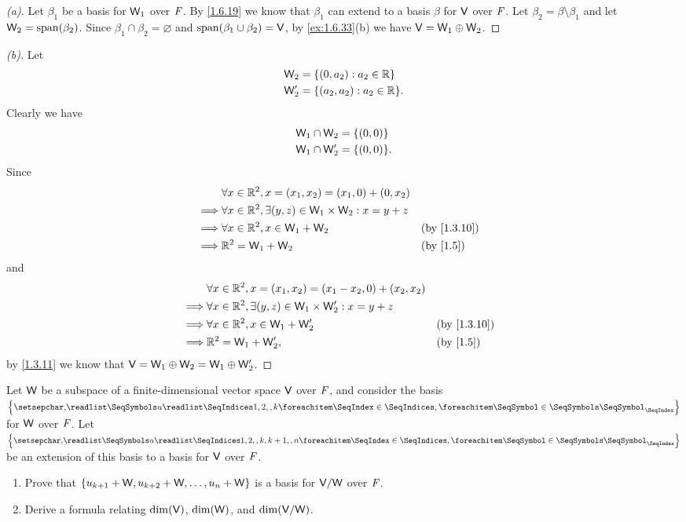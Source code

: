 \begin{proof}[(a)]
	Let \(\beta_1\) be a basis for \(\mathsf{W}_1\) over \(\mathit{F}\).
	By \cref{1.6.19} we know that \(\beta_1\) can extend to a basis \(\beta\) for \(\mathsf{V}\) over \(\mathit{F}\).
	Let \(\beta_2 = \beta \setminus \beta_1\) and let \(\W_2 = \spn{\beta_2}\).
	Since \(\beta_1 \cap \beta_2 = \varnothing\) and \(\spn{\beta_1 \cup \beta_2} = \V\), by \cref{ex:1.6.33}(b) we have \(\mathsf{V} = \mathsf{W}_1 \oplus \mathsf{W}_2\).
\end{proof}

\begin{proof}[(b)]
	Let
	\begin{align*}
		\W_2  & = \set{(0, a_2) : a_2 \in \R}    \\
		\W_2' & = \set{(a_2, a_2) : a_2 \in \R}.
	\end{align*}
	Clearly we have
	\begin{align*}
		\W_1 \cap \W_2  & = \set{(0, 0)}  \\
		\W_1 \cap \W_2' & = \set{(0, 0)}.
	\end{align*}
	Since
	\begin{align*}
		         & \forall x \in \R^2, x = (x_1, x_2) = (x_1, 0) + (0, x_2)                             \\
		\implies & \forall x \in \R^2, \exists (y, z) \in \W_1 \times \W_2 : x = y + z                  \\
		\implies & \forall x \in \R^2, x \in \W_1 + \W_2                               &  & \by{1.3.10} \\
		\implies & \R^2 = \W_1 + \W_2                                                  &  & \by{1.5}
	\end{align*}
	and
	\begin{align*}
		         & \forall x \in \R^2, x = (x_1, x_2) = (x_1 - x_2, 0) + (x_2, x_2)                      \\
		\implies & \forall x \in \R^2, \exists (y, z) \in \W_1 \times \W_2' : x = y + z                  \\
		\implies & \forall x \in \R^2, x \in \W_1 + \W_2'                               &  & \by{1.3.10} \\
		\implies & \R^2 = \W_1 + \W_2',                                                 &  & \by{1.5}
	\end{align*}
	by \cref{1.3.11} we know that \(\mathsf{V} = \mathsf{W}_1 \oplus \mathsf{W}_2 = \mathsf{W}_1 \oplus \mathsf{W}_2'\).
\end{proof}

\begin{ex}\label{ex:1.6.35}
	Let \(\mathsf{W}\) be a subspace of a finite-dimensional vector space \(\mathsf{V}\) over \(\mathit{F}\), and consider the basis \(\set{\seq{u}{1,2,,k}}\) for \(\mathsf{W}\) over \(\mathit{F}\).
	Let \(\set{\seq{u}{1,2,,k,k + 1,,n}}\) be an extension of this basis to a basis for \(\mathsf{V}\) over \(\mathit{F}\).
	\begin{enumerate}
		\item Prove that \(\left\lbrace u_{k + 1} + \mathsf{W}, u_{k + 2} + \mathsf{W}, \dots , u_n + \mathsf{W}\right\rbrace\) is a basis for \(\mathsf{V} / \mathsf{W}\) over \(\mathit{F}\).
		\item Derive a formula relating \(\dim(\mathsf{V})\), \(\dim(\mathsf{W})\), and \(\dim(\mathsf{V} / \mathsf{W})\).
	\end{enumerate}
\end{ex}

